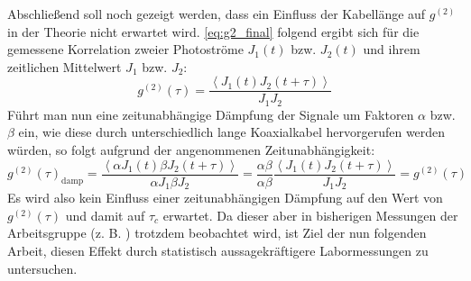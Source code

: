 Abschließend soll noch gezeigt werden, dass ein Einfluss der Kabellänge auf $g^{(2)}$ in der Theorie nicht erwartet wird. 
\autoref{eq:g2_final} folgend ergibt sich für die gemessene Korrelation zweier Photoströme $J_1(t)$ bzw. $J_2(t)$ und ihrem zeitlichen Mittelwert $J_1$ bzw. $J_2$:
\begin{equation}
    g^{(2)}(\tau) = \frac{\left<J_1(t) J_2(t+\tau) \right>}{J_1 J_2}
\end{equation}
Führt man nun eine zeitunabhängige Dämpfung der Signale um Faktoren $\alpha$ bzw. $\beta$ ein, wie diese durch unterschiedlich lange Koaxialkabel hervorgerufen werden würden, so folgt aufgrund der angenommenen Zeitunabhängigkeit:
\begin{equation}
    g^{(2)}(\tau)_{\mathrm{damp}} = \frac{\left<\alpha J_1(t) \beta J_2(t+\tau) \right>}{\alpha J_1 \beta J_2}
    = \frac{\alpha \beta}{\alpha \beta} \frac{\left<J_1(t) J_2(t+\tau) \right>}{J_1 J_2} = g^{(2)}(\tau)
\end{equation}
Es wird also kein Einfluss einer zeitunabhängigen Dämpfung auf den Wert von $g^{(2)}(\tau)$ und damit auf $\tau_c$ erwartet. 
Da dieser aber in bisherigen Messungen der Arbeitsgruppe (z. B. \cite{zmijaFirstIntensityInterferometry2023}) trotzdem beobachtet wird, ist Ziel der nun folgenden Arbeit, diesen Effekt durch statistisch aussagekräftigere Labormessungen zu untersuchen. 